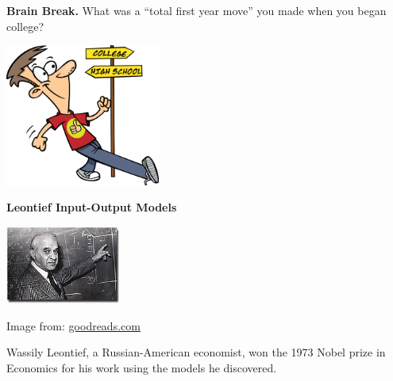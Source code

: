 \documentclass[handout]{beamer}
\newcommand{\fn}{\insertframenumber}
\theoremstyle{definition}
\begin{document}

\begin{frame}{\fn}
	\begin{block}{\textbf{Brain Break.}}
		What was a “total first year move” you made when you began college?
		\begin{center}
			\includegraphics[width=2in]{../images/first_year}
		\end{center}
	\end{block}
\end{frame}


\begin{frame}{\fn}
	\begin{center}
		{\large{}\textbf{Leontief Input-Output Models}}
		
		\includegraphics[width=1.5in]{../images/leontief}
		
		{\footnotesize Image from: \href{https://www.goodreads.com/author/show/181430.Wassily_Leontief}{goodreads.com}}
	\end{center}
	Wassily Leontief, a Russian-American economist, won the 1973 Nobel prize in Economics for his work using the models he discovered.
\end{frame}
\end{document}
